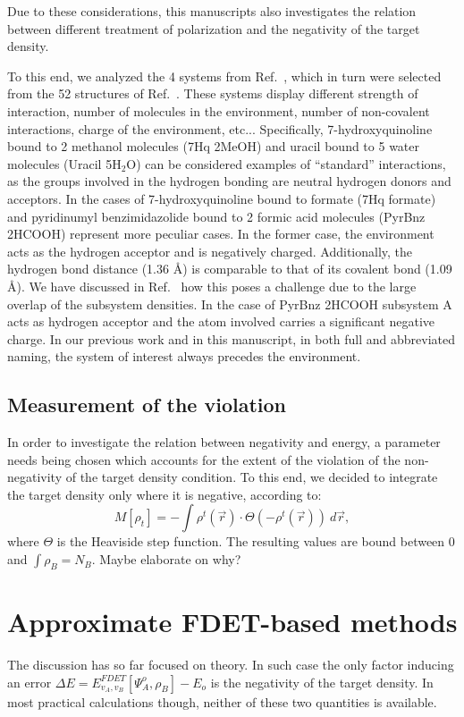 \documentclass[journal=jctcce,manuscript=article, layout=twocolumn]{achemso}
\newcommand{\nr}[1]{\color{red}#1\color{black}}
\begin{document}
Due to these considerations, this manuscripts also investigates the relation between different treatment of polarization and the negativity of the target density.

To this end, we analyzed the 4 systems from Ref.~, which in turn were selected from the 52 structures of Ref.~. These systems display different strength of interaction, number of molecules in the environment, number of non-covalent interactions, charge of the environment, etc...
Specifically, 7-hydroxyquinoline bound to 2 methanol molecules (7Hq 2MeOH) and uracil bound to 5 water molecules (Uracil 5H$_2$O) can be considered examples of ``standard'' interactions, as the groups involved in the hydrogen bonding are neutral hydrogen donors and acceptors. In the cases of 7-hydroxyquinoline bound to formate (7Hq formate) and pyridinumyl benzimidazolide bound to 2 formic acid molecules (PyrBnz 2HCOOH) represent more peculiar cases. In the former case, the environment acts as the hydrogen acceptor and is negatively charged. Additionally, the hydrogen bond distance (1.36 \AA) is comparable to that of its covalent bond (1.09 \AA). We have discussed in Ref.~ how this poses a challenge due to the large overlap of the subsystem densities. In the case of PyrBnz 2HCOOH subsystem A acts as hydrogen acceptor and the atom involved carries a significant negative charge.
In our previous work and in this manuscript, in both full and abbreviated naming, the system of interest always precedes the environment.

\subsection{Measurement of the violation}
In order to investigate the relation between negativity and energy, a parameter needs being chosen which accounts for the extent of the violation of the non-negativity of the target density condition.
To this end, we decided to integrate the target density only where it is negative, according to:
\begin{equation}\label{eq:M}
  M[\rho_{t}] = -\int \rho^{t}(\vec{r})\cdot \Theta(-\rho^{t}(\vec{r})) \ d\vec{r},
  \end{equation}
where $\Theta$ is the Heaviside step function. The resulting values are bound between 0 and $\int \rho_B = N_B$. \nr{Maybe elaborate on why?}
\section{Approximate FDET-based methods}
The discussion has so far focused on theory. In such case the only factor inducing an error $\Delta E = E_{v_A,v_B}^{FDET}[\Psi_{A}^{o},\rho_B] - E_o$ is the negativity of the target density. 
In most practical calculations though, neither of these two quantities is available.
\end{document}
